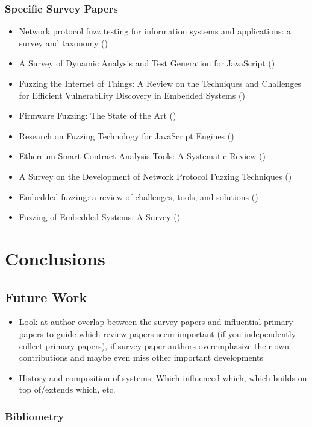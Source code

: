 \documentclass{article}
\begin{document}
\begin{multicols}{2}
    \subsubsection{Specific Survey Papers}
    \begin{itemize}
        \item    Network protocol fuzz testing for information systems and applications: a survey and taxonomy (\citeyear{Network})\cite{Network}
        \item    A Survey of Dynamic Analysis and Test Generation for JavaScript (\citeyear{JavaScript2})\cite{JavaScript2}
        \item    Fuzzing the Internet of Things: A Review on the Techniques and Challenges for Efficient Vulnerability Discovery in Embedded Systems (\citeyear{IoT})\cite{IoT}
        \item    Firmware Fuzzing: The State of the Art (\citeyear{Firmware})\cite{Firmware}
        \item    Research on Fuzzing Technology for JavaScript Engines (\citeyear{JavaScript})\cite{JavaScript}
        \item    Ethereum Smart Contract Analysis Tools: A Systematic Review (\citeyear{Ethereum})\cite{Ethereum}
        \item    A Survey on the Development of Network Protocol Fuzzing Techniques (\citeyear{Network2023})\cite{Network2023}
        \item    Embedded fuzzing: a review of challenges, tools, and solutions (\citeyear{Embedded2})\cite{Embedded2}
        \item    Fuzzing of Embedded Systems: A Survey (\citeyear{Embedded})\cite{Embedded}
    \end{itemize}

    \section{Conclusions}

    \subsection{Future Work}
    \begin{itemize}
        \item Look at author overlap between the survey papers and influential primary papers to guide which review papers seem important (if you independently collect primary papers), if survey paper authors overemphasize their own contributions and maybe even miss other important developments
        \item History and composition of systems: Which influenced which, which builds on top of/extends which, etc.
    \end{itemize}

    \subsubsection{Bibliometry}

    \printbibliography
\end{multicols}
\end{document}
